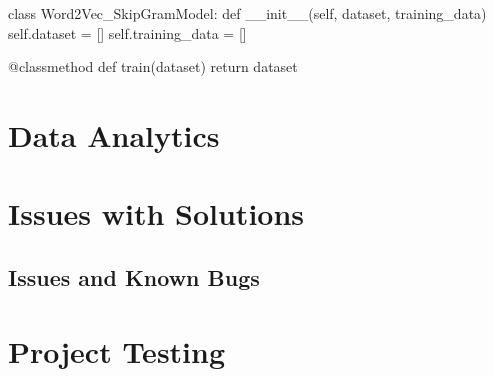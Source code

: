\begin{python}
    class Word2Vec_SkipGramModel:
        def __init__(self, dataset, training_data)
            self.dataset = []
            self.training_data = []

        @classmethod
        def train(dataset)
            return dataset
\end{python}

\section{Data Analytics}

\section{Issues with Solutions}

\subsection{Issues and Known Bugs}

\section{Project Testing}